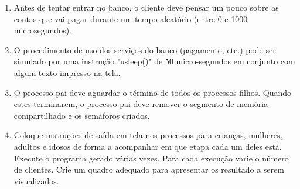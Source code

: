 \documentclass[a4paper,10pt]{article}
\begin{document}
\begin{enumerate}
\begin{enumerate}
       \item Antes de tentar entrar no banco, o cliente deve pensar um pouco sobre as contas que vai pagar durante um tempo aleatório (entre 0 e 
	    1000 microsegundos).
       \item O procedimento de uso dos serviços do banco (pagamento, etc.) pode ser simulado por uma instrução "usleep()" de 50 micro-segundos em 
	    conjunto com algum texto impresso na tela.
       \item O processo pai deve aguardar o término de todos os processos filhos. Quando estes terminarem, o processo pai deve remover o segmento 
	    de memória compartilhado e os semáforos criados.
       \item Coloque instruções de saída em tela nos processos para crianças, mulheres, adultos e idosos de forma a acompanhar em que etapa cada 
	    um deles está. Execute o programa gerado várias vezes. Para cada execução varie o número de clientes. Crie um quadro adequado para 
	    apresentar os resultado a serem visualizados. 
      \end{enumerate}
\end{enumerate}
\end{document}
